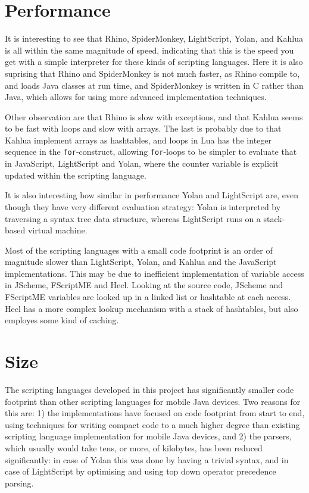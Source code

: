 \documentclass[11pt]{report}
\begin{document}
\section{Performance}
It is interesting to see that Rhino, SpiderMonkey, LightScript, Yolan, and Kahlua is all within the same magnitude of speed, indicating that this is the speed you get with a simple interpreter for these kinds of scripting languages. Here it is also suprising that Rhino and SpiderMonkey is not much faster, as Rhino compile to, and loads Java classes at run time, and SpiderMonkey is written in C rather than Java, which allows for using more advanced implementation techniques.

Other observation are that Rhino is slow with exceptions, and that Kahlua seems to be fast with loops and slow with arrays. The last is probably due to that Kahlua implement arrays as hashtables, and loops in Lua has the integer sequence in the \verb|for|-construct, allowing \verb|for|-loops to be simpler to evaluate that in JavaScript, LightScript and Yolan, where the counter variable is explicit updated within the scripting language.

It is also interesting how similar in performance Yolan and LightScript are, even though they have very different evaluation strategy: Yolan is interpreted by traversing a syntax tree data structure, whereas LightScript runs on a stack-based virtual machine. 

Most of the scripting languages with a small code footprint is an order of magnitude slower than LightScript, Yolan, and Kahlua and the JavaScript implementations.
This may be due to inefficient implementation of variable access in JScheme, FScriptME and Hecl. Looking at the source code, JScheme and FScriptME variables are looked up in a linked list or hashtable at each access. Hecl has a more complex lookup mechanism with a stack of hashtables, but also employes some kind of caching.

\section{Size}

The scripting languages developed in this project has significantly smaller code footprint than other scripting languages for mobile Java devices.
Two reasons for this are: 1) the implementations have focused on code footprint from start to end, using techniques for writing compact code to a much higher degree than existing scripting language implementation for mobile Java devices, and 2) the parsers, which usually would take tens, or more, of kilobytes, has been reduced significantly: in case of Yolan this was done by having a trivial syntax, and in case of LightScript by optimising and using top down operator precedence parsing.
\end{document}
